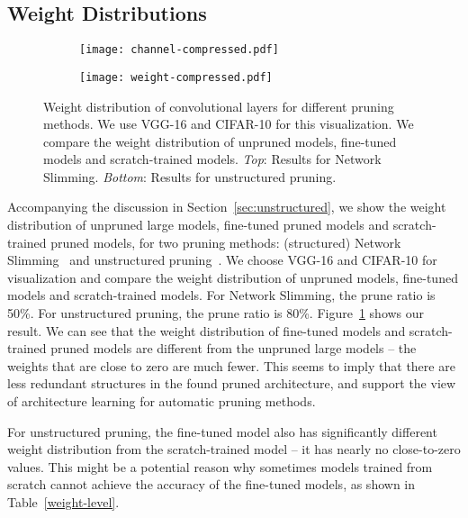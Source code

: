 \subsection{Weight Distributions}
\label{sec:dist}
\begin{figure}[!htbp]
\centering
\begin{minipage}{\textwidth}
 \begin{subfigure}{\textwidth}
 \centering
 \texttt{[image: channel-compressed.pdf]}
 \end{subfigure}
\end{minipage}
\begin{minipage}{\textwidth}
 \begin{subfigure}{\textwidth}
 \centering
\texttt{[image: weight-compressed.pdf]}
 \end{subfigure}
\end{minipage}
    \caption{Weight distribution of convolutional layers for different pruning methods. We use VGG-16 and CIFAR-10 for this visualization. We compare the weight distribution of unpruned models,  fine-tuned models and scratch-trained models. \emph{Top}: Results for Network Slimming. \emph{Bottom}: Results for unstructured pruning.}  
    \label{dist}
\end{figure}

Accompanying the discussion in Section~\ref{sec:unstructured}, we show the weight distribution of unpruned large models, fine-tuned pruned models and scratch-trained pruned models, for two pruning methods: (structured) Network Slimming~\cite{liu2017learning} and unstructured pruning~\cite{han2015learning}. We choose VGG-16 and CIFAR-10 for visualization and compare the weight distribution of unpruned models, fine-tuned models and scratch-trained models. For Network Slimming, the prune ratio is 50\%. For unstructured pruning, the prune ratio is 80\%. Figure~\ref{dist} shows our result.  We can see that the weight distribution of fine-tuned models and scratch-trained pruned models are  different from the unpruned large models -- the weights that are close to zero are much fewer.  This seems to imply that there are less redundant structures in the found pruned architecture, and support the view of architecture learning for automatic pruning methods.

For unstructured pruning, the fine-tuned model also has significantly different weight distribution from the scratch-trained model -- it has nearly no close-to-zero values. This might be a potential reason why sometimes  models trained from scratch cannot achieve the accuracy of the fine-tuned models, as shown in Table~\ref{weight-level}.

